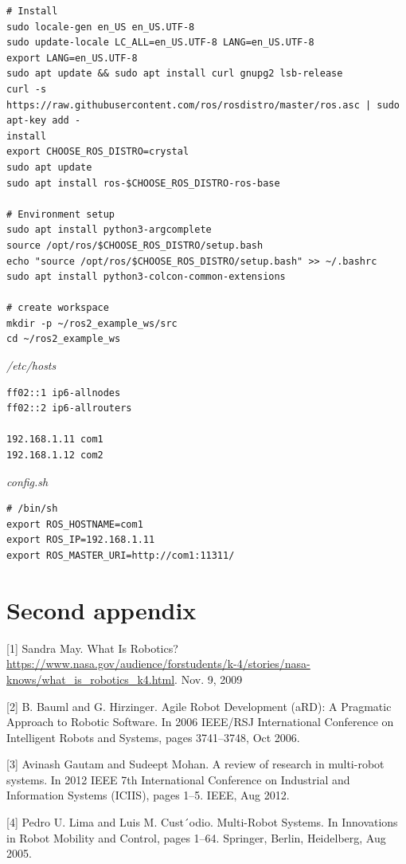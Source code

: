 \documentclass{mproj}
\begin{document}
\begin{verbatim}
# Install 
sudo locale-gen en_US en_US.UTF-8
sudo update-locale LC_ALL=en_US.UTF-8 LANG=en_US.UTF-8
export LANG=en_US.UTF-8
sudo apt update && sudo apt install curl gnupg2 lsb-release
curl -s 
https://raw.githubusercontent.com/ros/rosdistro/master/ros.asc | sudo apt-key add -
install
export CHOOSE_ROS_DISTRO=crystal
sudo apt update
sudo apt install ros-$CHOOSE_ROS_DISTRO-ros-base

# Environment setup
sudo apt install python3-argcomplete
source /opt/ros/$CHOOSE_ROS_DISTRO/setup.bash
echo "source /opt/ros/$CHOOSE_ROS_DISTRO/setup.bash" >> ~/.bashrc
sudo apt install python3-colcon-common-extensions

# create workspace
mkdir -p ~/ros2_example_ws/src
cd ~/ros2_example_ws

\end{verbatim}
\textit{/etc/hosts}
\begin{verbatim}
ff02::1 ip6-allnodes
ff02::2 ip6-allrouters

192.168.1.11 com1
192.168.1.12 com2
\end{verbatim}
\textit{config.sh}
\begin{verbatim}
# /bin/sh
export ROS_HOSTNAME=com1
export ROS_IP=192.168.1.11
export ROS_MASTER_URI=http://com1:11311/
\end{verbatim}

\chapter{Second appendix}



[1] Sandra May. What Is Robotics?  \url{https://www.nasa.gov/audience/forstudents/k-4/stories/nasa-knows/what_is_robotics_k4.html}. Nov. 9, 2009

[2] B. Bauml and G. Hirzinger. Agile Robot Development (aRD): A Pragmatic Approach to Robotic Software. In 2006 IEEE/RSJ International Conference on Intelligent Robots and Systems, pages 3741–3748, Oct 2006.

[3] Avinash Gautam and Sudeept Mohan. A review of research in multi-robot systems. In 2012 IEEE 7th International Conference on Industrial and Information Systems (ICIIS), pages 1–5. IEEE, Aug 2012.

[4] Pedro U. Lima and Luis M. Cust´odio. Multi-Robot Systems. In Innovations in Robot Mobility and Control, pages 1–64. Springer, Berlin, Heidelberg, Aug 2005.
\end{document}
